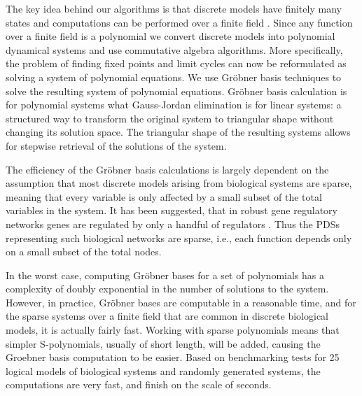 \documentclass[11pt]{amsart}
\begin{document}
The key idea behind our algorithms is that discrete models have finitely many states and computations 
can be performed over a finite field \cite{Alan:Bioinf2010,
Hinkelmann:2010}. Since any function over a finite field is a polynomial
\cite{Lidl:1997} we convert discrete models into polynomial dynamical systems
and use commutative algebra algorithms. More specifically, the problem of finding fixed points and limit cycles
can now be reformulated as solving a system of polynomial equations. We use Gr\"{o}bner basis techniques to solve the 
resulting system of polynomial equations. Gr\"obner basis calculation is for polynomial systems what
Gauss-Jordan elimination is for linear systems: a structured way to transform
the original system to triangular shape without changing its solution space.
The triangular shape of the resulting systems allows for stepwise retrieval of the solutions of the system.

The efficiency of the Gr\"obner basis calculations is largely dependent on the
assumption that most discrete models arising from biological systems are
sparse, meaning that every variable is only affected by a small subset of the
total variables in the system. It has been suggested, that in robust gene
regulatory networks genes are regulated by only a handful of regulators
\cite{Leclerc:2008}. Thus the PDSs representing such biological networks are
sparse, i.e., each function depends only on a small subset of the total nodes.

In the worst case, computing Gr\"obner bases for a set of polynomials has a
complexity of doubly exponential in the number of solutions to the system.
However, in practice, Gr\"{o}bner bases are computable in a reasonable time, and
for the sparse systems over a finite field that are common in discrete
biological models, it is actually fairly fast. 
Working with sparse polynomials means that simpler
S-polynomials, usually of short length, will be added, causing the Groebner
basis computation to be easier.
Based on benchmarking tests for 
25 logical models of biological systems \cite{GINsim} 
and randomly generated systems,
the computations are very fast, and finish on the scale of
seconds.
\end{document}
